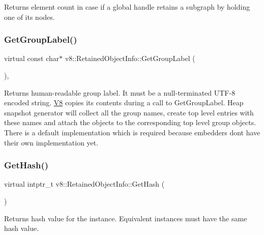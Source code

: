 Returns element count in case if a global handle retains a subgraph by holding one of its nodes. \mbox{\label{classv8_1_1RetainedObjectInfo_adf835370c5516f2a89dd2d3f83dee10b}} 
\subsubsection{\texorpdfstring{Get\+Group\+Label()}{GetGroupLabel()}}
{\footnotesize\ttfamily virtual const char$\ast$ v8\+::\+Retained\+Object\+Info\+::\+Get\+Group\+Label (\begin{DoxyParamCaption}{ }\end{DoxyParamCaption})\hspace{0.3cm}{\ttfamily [inline]}, {\ttfamily [virtual]}}

Returns human-\/readable group label. It must be a null-\/terminated U\+T\+F-\/8 encoded string. \mbox{\hyperlink{classv8_1_1V8}{V8}} copies its contents during a call to Get\+Group\+Label. Heap snapshot generator will collect all the group names, create top level entries with these names and attach the objects to the corresponding top level group objects. There is a default implementation which is required because embedders don\textquotesingle{}t have their own implementation yet. \mbox{\label{classv8_1_1RetainedObjectInfo_a6fdbfa242b95615e63f08433419c8066}} 
\subsubsection{\texorpdfstring{Get\+Hash()}{GetHash()}}
{\footnotesize\ttfamily virtual intptr\+\_\+t v8\+::\+Retained\+Object\+Info\+::\+Get\+Hash (\begin{DoxyParamCaption}{ }\end{DoxyParamCaption})\hspace{0.3cm}{\ttfamily [pure virtual]}}

Returns hash value for the instance. Equivalent instances must have the same hash value. \mbox{\label{classv8_1_1RetainedObjectInfo_ad19106fc7f0499fd45005077551d54c0}} 

